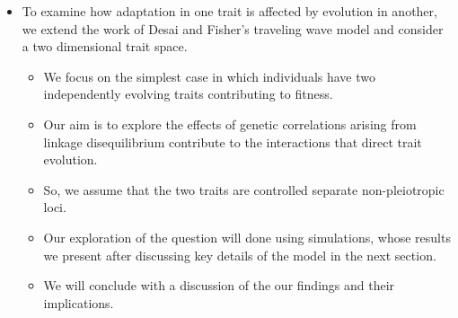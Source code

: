 \documentclass[11pt,one column]{article}
\begin{document}
\begin{itemize}
\item To examine how adaptation in one trait is affected by evolution in another, we extend the work of Desai and Fisher's traveling wave model and consider a two dimensional trait space.
\begin{itemize}
\item We focus on the simplest case in which individuals have two independently evolving traits contributing to fitness.
\item Our aim is to explore the effects of genetic correlations arising from linkage disequilibrium contribute to the interactions that direct trait evolution.
\item So, we assume that the two traits are controlled separate non-pleiotropic loci.
\item Our exploration of the question will done using simulations, whose results we present after discussing key details of the model in the next section.
\item We will conclude with a discussion of the our findings and their implications.
\end{itemize}

\end{itemize}
\end{document}
